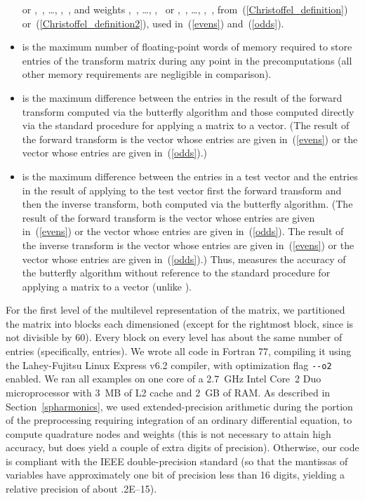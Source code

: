 \documentclass[final,3p,times]{elsarticle}
\begin{document}
\begin{itemize}
      or ,~, \dots, ,~,
      and weights ,~, \dots, ,~
      or ,~, \dots, ,~,
      from~(\ref{Christoffel_definition}) or~(\ref{Christoffel_definition2}),
      used in~(\ref{evens}) and~(\ref{odds}).
\item  is the maximum number of floating-point words
      of memory required to store entries of the transform matrix
      during any point in the precomputations
      (all other memory requirements are negligible in comparison).
\item  is the maximum difference between the entries
      in the result of the forward transform computed
      via the butterfly algorithm and those computed directly
      via the standard procedure for applying a matrix to a vector.
      (The result of the forward transform is the vector 
      whose entries are given in~(\ref{evens})
      or the vector  whose entries are given in~(\ref{odds}).)
\item  is the maximum difference between the entries
      in a test vector and the entries in the result of applying
      to the test vector first the forward transform and
      then the inverse transform, both computed via the butterfly algorithm.
      (The result of the forward transform is the vector 
      whose entries are given in~(\ref{evens})
      or the vector  whose entries are given in~(\ref{odds}).
      The result of the inverse transform is the vector 
      whose entries are given in~(\ref{evens})
      or the vector  whose entries are given in~(\ref{odds}).)
      Thus,  measures the accuracy
      of the butterfly algorithm without reference to the standard procedure
      for applying a matrix to a vector (unlike ).
\end{itemize}

For the first level of the multilevel representation
of the  matrix, we partitioned the matrix
into blocks each dimensioned 
(except for the rightmost block, since  is not divisible by 60).
Every block on every level has about the same number of entries
(specifically,  entries).
We wrote all code in Fortran 77, compiling it using
the Lahey-Fujitsu Linux Express v6.2 compiler, with optimization flag
{\tt {-}{-}o2} enabled.
We ran all examples on one core of a 2.7~GHz Intel Core~2 Duo microprocessor
with 3~MB of L2 cache and 2~GB of RAM.
As described in Section~\ref{spharmonics},
we used extended-precision arithmetic during the portion of the preprocessing
requiring integration of an ordinary differential equation,
to compute quadrature nodes and weights
(this is not necessary to attain high accuracy, but does yield a couple
of extra digits of precision).
Otherwise, our code is compliant with the IEEE double-precision standard
(so that the mantissas of variables have approximately one bit of precision
less than 16 digits, yielding a relative precision of about .2E--15).
\end{document}
